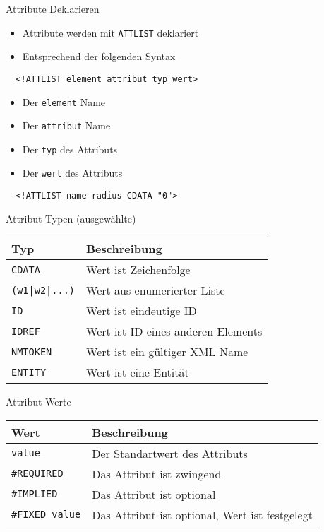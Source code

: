 \documentclass{beamer}
\begin{document}
\begin{frame}[fragile]{Attribute Deklarieren}
	
	\begin{itemize}
		\item Attribute werden mit \texttt{ATTLIST} deklariert
		\item Entsprechend der folgenden Syntax
	\end{itemize}
	
	\lstset{language=XML}
	\begin{lstlisting}
  <!ATTLIST element attribut typ wert>
	\end{lstlisting}
	
	\begin{itemize}
		\item Der \texttt{element} Name
		\item Der \texttt{attribut} Name
		\item Der \texttt{typ} des Attributs
		\item Der \texttt{wert} des Attributs
	\end{itemize}
	
	\begin{lstlisting}
  <!ATTLIST name radius CDATA "0">
	\end{lstlisting}
	
\end{frame}

\begin{frame}[fragile]{Attribut Typen (ausgewählte)}
	
	\centering
	\begin{tabular}{l|l}
	Typ & Beschreibung \\
	\hline
	\texttt{CDATA} & Wert ist Zeichenfolge \\
	\texttt{(w1|w2|...)} & Wert aus enumerierter Liste \\
	\texttt{ID} & Wert ist eindeutige ID \\
	\texttt{IDREF} & Wert ist ID eines anderen Elements \\
	\texttt{NMTOKEN} & Wert ist ein gültiger XML Name \\
	\texttt{ENTITY} & Wert ist eine Entität \\
	\hline
	\end{tabular}
	
\end{frame}

\begin{frame}[fragile]{Attribut Werte}
	
	\centering
	\begin{tabular}{l|l}
		Wert & Beschreibung \\
		\hline
		\texttt{value} & Der Standartwert des Attributs \\
		\texttt{\#REQUIRED} & Das Attribut ist zwingend \\
		\texttt{\#IMPLIED} & Das Attribut ist optional \\
		\texttt{\#FIXED value} & Das Attribut ist optional, Wert ist festgelegt \\
		\hline
	\end{tabular}
	
\end{frame}
\end{document}
